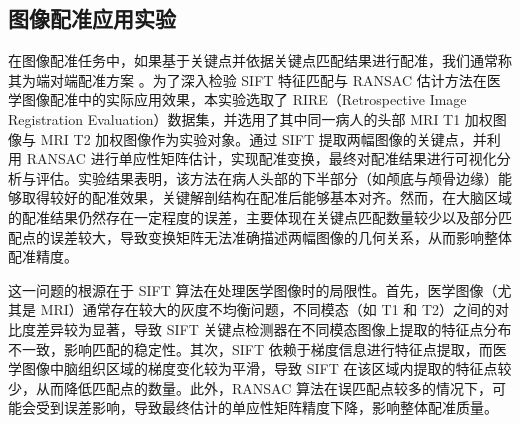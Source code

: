 \documentclass[a4paper, utf8]{ctexart}
\begin{document}
	\subsection{图像配准应用实验}
	
	在图像配准任务中，如果基于关键点并依据关键点匹配结果进行配准，我们通常称其为端对端配准方案 \cite{reg}。为了深入检验 SIFT 特征匹配与 RANSAC 估计方法在医学图像配准中的实际应用效果，本实验选取了 RIRE（Retrospective Image Registration Evaluation）数据集，并选用了其中同一病人的头部 MRI T1 加权图像与 MRI T2 加权图像作为实验对象。通过 SIFT 提取两幅图像的关键点，并利用 RANSAC 进行单应性矩阵估计，实现配准变换，最终对配准结果进行可视化分析与评估。实验结果表明，该方法在病人头部的下半部分（如颅底与颅骨边缘）能够取得较好的配准效果，关键解剖结构在配准后能够基本对齐。然而，在大脑区域的配准结果仍然存在一定程度的误差，主要体现在关键点匹配数量较少以及部分匹配点的误差较大，导致变换矩阵无法准确描述两幅图像的几何关系，从而影响整体配准精度。  
	
	这一问题的根源在于 SIFT 算法在处理医学图像时的局限性。首先，医学图像（尤其是 MRI）通常存在较大的灰度不均衡问题，不同模态（如 T1 和 T2）之间的对比度差异较为显著，导致 SIFT 关键点检测器在不同模态图像上提取的特征点分布不一致，影响匹配的稳定性。其次，SIFT 依赖于梯度信息进行特征点提取，而医学图像中脑组织区域的梯度变化较为平滑，导致 SIFT 在该区域内提取的特征点较少，从而降低匹配点的数量。此外，RANSAC 算法在误匹配点较多的情况下，可能会受到误差影响，导致最终估计的单应性矩阵精度下降，影响整体配准质量。
	
\end{document}
